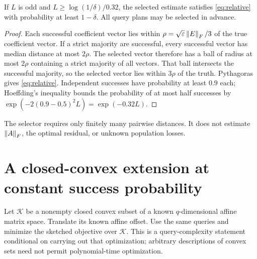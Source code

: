 \documentclass[11pt]{article}
\begin{document}
\begin{proposition}\label{prop:amplification}
If $L$ is odd and $L\ge\log(1/\delta)/0.32$, the selected estimate satisfies \eqref{eq:relative} with probability at least $1-\delta$. All query plans may be selected in advance.
\end{proposition}
\begin{proof}
Each successful coefficient vector lies within
$\rho=\sqrt{\varepsilon}\left\lVert E\right\rVert_F/3$ of the true coefficient vector. If a strict majority are successful, every successful vector has median distance at most $2\rho$. The selected vector therefore has a ball of radius at most $2\rho$ containing a strict majority of all vectors. That ball intersects the successful majority, so the selected vector lies within $3\rho$ of the truth. Pythagoras gives \eqref{eq:relative}. Independent successes have probability at least $0.9$ each; Hoeffding's inequality bounds the probability of at most half successes by $\exp(-2(0.9-0.5)^2L)=\exp(-0.32L)$.
\end{proof}

The selector requires only finitely many pairwise distances. It does not estimate $\left\lVert A\right\rVert_F$, the optimal residual, or unknown population losses.

\section{A closed-convex extension at constant success probability}
Let $\mathcal K$ be a nonempty closed convex subset of a known $q$-dimensional affine matrix space. Translate its known affine offset. Use the same queries and minimize the sketched objective over $\mathcal K$. This is a query-complexity statement conditional on carrying out that optimization; arbitrary descriptions of convex sets need not permit polynomial-time optimization.
\end{document}
